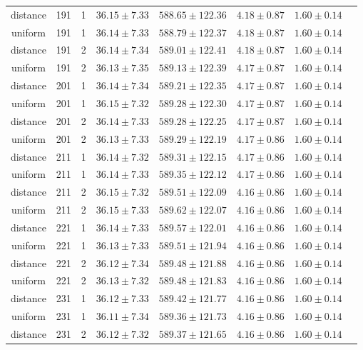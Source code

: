 \begin{tabular}{cccrrrrr}
distance & 191 & 1 & $36.15 \pm 7.33$ & $588.65 \pm 122.36$ & $4.18 \pm 0.87$ & $1.60 \pm 0.14$\\
uniform & 191 & 1 & $36.14 \pm 7.33$ & $588.79 \pm 122.37$ & $4.18 \pm 0.87$ & $1.60 \pm 0.14$\\
distance & 191 & 2 & $36.14 \pm 7.34$ & $589.01 \pm 122.41$ & $4.18 \pm 0.87$ & $1.60 \pm 0.14$\\
uniform & 191 & 2 & $36.13 \pm 7.35$ & $589.13 \pm 122.39$ & $4.17 \pm 0.87$ & $1.60 \pm 0.14$\\
distance & 201 & 1 & $36.14 \pm 7.34$ & $589.21 \pm 122.35$ & $4.17 \pm 0.87$ & $1.60 \pm 0.14$\\
uniform & 201 & 1 & $36.15 \pm 7.32$ & $589.28 \pm 122.30$ & $4.17 \pm 0.87$ & $1.60 \pm 0.14$\\
distance & 201 & 2 & $36.14 \pm 7.33$ & $589.28 \pm 122.25$ & $4.17 \pm 0.87$ & $1.60 \pm 0.14$\\
uniform & 201 & 2 & $36.13 \pm 7.33$ & $589.29 \pm 122.19$ & $4.17 \pm 0.86$ & $1.60 \pm 0.14$\\
distance & 211 & 1 & $36.14 \pm 7.32$ & $589.31 \pm 122.15$ & $4.17 \pm 0.86$ & $1.60 \pm 0.14$\\
uniform & 211 & 1 & $36.14 \pm 7.33$ & $589.35 \pm 122.12$ & $4.17 \pm 0.86$ & $1.60 \pm 0.14$\\
distance & 211 & 2 & $36.15 \pm 7.32$ & $589.51 \pm 122.09$ & $4.16 \pm 0.86$ & $1.60 \pm 0.14$\\
uniform & 211 & 2 & $36.15 \pm 7.33$ & $589.62 \pm 122.07$ & $4.16 \pm 0.86$ & $1.60 \pm 0.14$\\
distance & 221 & 1 & $36.14 \pm 7.33$ & $589.57 \pm 122.01$ & $4.16 \pm 0.86$ & $1.60 \pm 0.14$\\
uniform & 221 & 1 & $36.13 \pm 7.33$ & $589.51 \pm 121.94$ & $4.16 \pm 0.86$ & $1.60 \pm 0.14$\\
distance & 221 & 2 & $36.12 \pm 7.34$ & $589.48 \pm 121.88$ & $4.16 \pm 0.86$ & $1.60 \pm 0.14$\\
uniform & 221 & 2 & $36.13 \pm 7.32$ & $589.48 \pm 121.83$ & $4.16 \pm 0.86$ & $1.60 \pm 0.14$\\
distance & 231 & 1 & $36.12 \pm 7.33$ & $589.42 \pm 121.77$ & $4.16 \pm 0.86$ & $1.60 \pm 0.14$\\
uniform & 231 & 1 & $36.11 \pm 7.34$ & $589.36 \pm 121.73$ & $4.16 \pm 0.86$ & $1.60 \pm 0.14$\\
distance & 231 & 2 & $36.12 \pm 7.32$ & $589.37 \pm 121.65$ & $4.16 \pm 0.86$ & $1.60 \pm 0.14$\\

\end{tabular}
